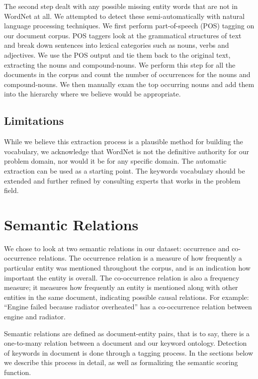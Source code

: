 The second step dealt with any possible missing entity words that are not in
WordNet at all. We attempted to detect these semi-automatically with natural
language processing techniques. We first perform part-of-speech (POS) tagging on our document 
corpus. POS taggers look at the grammatical structures of text and break down 
sentences into lexical categories such as nouns, verbs and adjectives. We use the 
POS output and tie them back to the original text, extracting the nouns and 
compound-nouns. We perform this step for all the documents in the corpus and 
count the number of occurrences for the nouns and compound-nouns. We then manually 
exam the top occurring nouns and add them into the hierarchy where we believe 
would be appropriate.

\subsection{Limitations}
While we believe this extraction process is a plausible method for building the
vocabulary, we acknowledge that WordNet is not the definitive authority for our 
problem domain, nor would it be for any specific domain. The automatic
extraction can be used as a starting point. The keywords vocabulary should be
extended and further refined by consulting experts that works in the problem field. 



\section{Semantic Relations}
We chose to look at two semantic relations in our dataset: occurrence and
co-occurrence relations. The occurrence relation is a measure of how frequently
a particular entity was mentioned throughout the corpus, and is an
indication how important the entity is overall. The co-occurrence relation is
also a frequency measure; it measures how frequently an entity is mentioned along
with other entities in the same document, indicating possible causal relations.
For example: ``Engine failed because radiator overheated'' has a co-occurrence
relation between engine and radiator.

Semantic relations are defined as document-entity pairs, that is to say, there
is a one-to-many relation between a document and our keyword ontology. Detection of
keywords in document is done through a tagging process. In the sections below we
describe this process in detail, as well as formalizing the semantic scoring
function.
 

